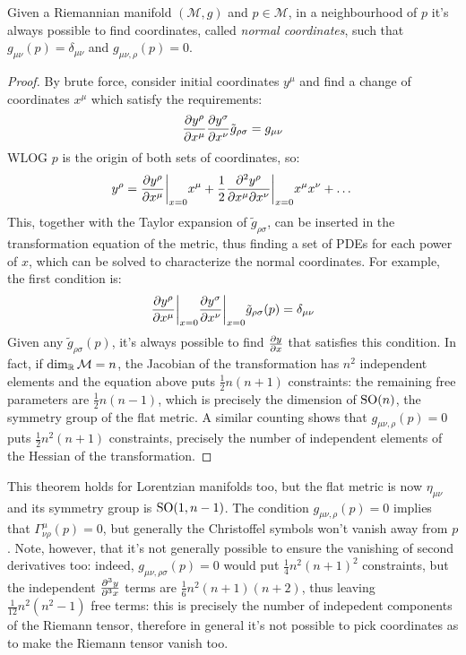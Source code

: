 \begin{theorem}
  Given a Riemannian manifold $ (\mathcal{M},g) $ and $ p \in \mathcal{M} $, in a neighbourhood of $ p $ it's always possible to find coordinates, called \textit{normal coordinates}, such that $ g_{\mu \nu}(p) = \delta_{\mu \nu} $ and $ g_{\mu \nu , \rho}(p) = 0 $.
\end{theorem}
\begin{proof}
  By brute force, consider initial coordinates $ y^\mu $ and find a change of coordinates $ x^\mu $ which satisfy the requirements:
  \begin{equation*}
    \frac{\partial y^\rho}{\partial x^\mu} \frac{\partial y^\sigma}{\partial x^\nu} \tilde{g}_{\rho \sigma} = g_{\mu \nu}
  \end{equation*}
  WLOG $ p $ is the origin of both sets of coordinates, so:
  \begin{equation*}
    y^\rho = \frac{\partial y^\rho}{\partial x^\mu}\bigg\vert_{x = 0} x^\mu + \frac{1}{2} \frac{\partial^2 y^\rho}{\partial x^\mu \partial x^\nu}\bigg\vert_{x = 0} x^\mu x^\nu + \dots
  \end{equation*}
  This, together with the Taylor expansion of $ \tilde{g}_{\rho \sigma} $, can be inserted in the transformation equation of the metric, thus finding a set of PDEs for each power of $ x $, which can be solved to characterize the normal coordinates. For example, the first condition is:
  \begin{equation*}
    \frac{\partial y^\rho}{\partial x^\mu}\bigg\vert_{x = 0} \frac{\partial y^\sigma}{\partial x^\nu}\bigg\vert_{x = 0} \tilde{g}_{\rho \sigma}(p) = \delta_{\mu \nu}
  \end{equation*}
  Given any $ \tilde{g}_{\rho \sigma}(p) $, it's always possible to find $ \frac{\partial y}{\partial x} $ that satisfies this condition. In fact, if $ \dim_{\mathbb{R}} \mathcal{M} = n $, the Jacobian of the transformation has $ n^2 $ independent elements and the equation above puts $ \frac{1}{2} n (n + 1) $ constraints: the remaining free parameters are $ \frac{1}{2} n (n - 1) $, which is precisely the dimension of $ \mathrm{SO}(n) $, the symmetry group of the flat metric.
  A similar counting shows that $ g_{\mu \nu , \rho}(p) = 0 $ puts $ \frac{1}{2} n^2 (n + 1) $ constraints, precisely the number of independent elements of the Hessian of the transformation.
\end{proof}

This theorem holds for Lorentzian manifolds too, but the flat metric is now $ \eta_{\mu \nu} $ and its symmetry group is $ \mathrm{SO}(1, n-1) $. The condition $ g_{\mu \nu , \rho}(p) = 0 $ implies that $ \Gamma^\mu_{\nu \rho}(p) = 0 $, but generally the Christoffel symbols won't vanish away from $ p $. Note, however, that it's not generally possible to ensure the vanishing of second derivatives too: indeed, $ g_{\mu \nu , \rho \sigma}(p) = 0 $ would put $ \frac{1}{4} n^2 (n + 1)^2 $ constraints, but the independent $ \frac{\partial^3 y}{\partial^3 x} $ terms are $ \frac{1}{6} n^2 (n+1) (n+2) $, thus leaving $ \frac{1}{12} n^2 (n^2 - 1) $ free terms: this is precisely the number of indepedent components of the Riemann tensor, therefore in general it's not possible to pick coordinates as to make the Riemann tensor vanish too.


